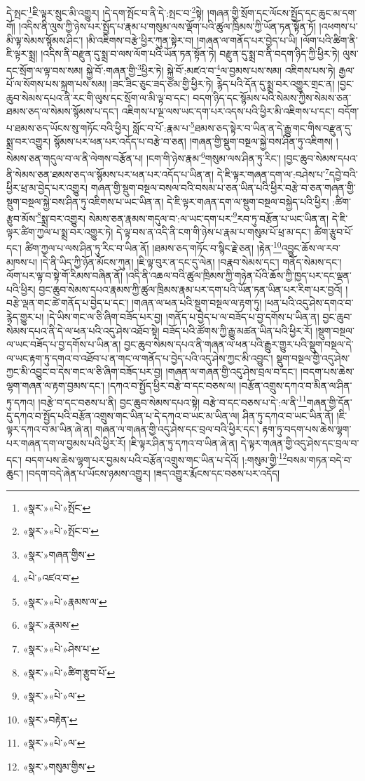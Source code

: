 དེ་སྤང་\footnote{«སྣར་»«པེ་»སྤོང་}ཇི་ལྟར་སྲུང་མི་འགྱུར། །དེ་དག་སྤོང་བ་ནི་དེ་:སྤང་བ་\footnote{«སྣར་»«པེ་»སྤོང་བ་}སྟེ། །གཞན་གྱི་སྲོག་དང་ལོངས་སྤྱོད་དང་ཆུང་མ་དག་གོ། །འདིས་ནི་ལུས་ཀྱི་ཉེས་པར་སྤྱོད་པ་རྣམ་པ་གསུམ་ལས་ལྡོག་པའི་ཚུལ་ཁྲིམས་ཀྱི་ཡོན་ཏན་སྟོན་ཏོ། །འཕགས་པ་མི་ལྟ་སེམས་སྙོམས་ཤིང་། །མི་འཇིགས་བརྩེ་ཕྱིར་ཀུན་སྟེར་བ། །གཞན་ལ་གནོད་པར་བྱེད་པ་ཡི། །ལོག་པའི་ཚིག་ནི་ཇི་ལྟར་སྨྲ། །འདིས་ནི་བརྫུན་དུ་སྨྲ་བ་ལས་ལོག་པའི་ཡོན་ཏན་སྟོན་ཏེ། བརྫུན་དུ་སྨྲ་བ་ནི་བདག་ཉིད་ཀྱི་ཕྱིར་ཏེ། ལུས་དང་སྲོག་ལ་ལྟ་བས་སམ། སྐྱེ་བོ་:གཞན་གྱི་\footnote{«སྣར་»གཞན་གྱིས་}ཕྱིར་ཏེ། སྐྱེ་བོ་:མཛའ་བ་\footnote{«པེ་»འཛའ་བ་}ལ་བྱམས་པས་སམ། འཇིགས་པས་ཏེ། རྒྱལ་པོ་ལ་སོགས་པས་སྐྲག་པས་སམ། །ཟང་ཟིང་ཅུང་ཟད་ཙམ་གྱི་ཕྱིར་ཏེ། རྙེད་པའི་དོན་དུ་སྨྲ་བར་འགྱུར་གྲང་ན། །བྱང་ཆུབ་སེམས་དཔའ་ནི་རང་གི་ལུས་དང་སྲོག་ལ་མི་ལྟ་བ་དང་། བདག་ཉིད་དང་སྙོམས་པའི་སེམས་ཀྱིས་སེམས་ཅན་ཐམས་ཅད་ལ་སེམས་སྙོམས་པ་དང་། འཇིགས་པ་ལྔ་ལས་ཡང་དག་པར་འདས་པའི་ཕྱིར་མི་འཇིགས་པ་དང་། བདོག་པ་ཐམས་ཅད་ཡོངས་སུ་གཏོང་བའི་ཕྱིར། སློང་བ་པོ་:རྣམ་པ་\footnote{«སྣར་»«པེ་»རྣམས་ལ་}ཐམས་ཅད་སྟེར་བ་ཡིན་ན་དེ་རྒྱུ་གང་གིས་བརྫུན་དུ་སྨྲ་བར་འགྱུར། སྙོམས་པར་ཕན་པར་འདོད་པ་བརྩེ་བ་ཅན། །གཞན་གྱི་སྡུག་བསྔལ་སྐྱེ་བས་ཤིན་ཏུ་འཇིགས། །སེམས་ཅན་གདུལ་བ་ལ་ནི་ལེགས་བརྩོན་པ། །ངག་གི་ཉེས་རྣམ་\footnote{«སྣར་»རྣམས་}གསུམ་ལས་ཤིན་ཏུ་རིང་། །བྱང་ཆུབ་སེམས་དཔའ་ནི་སེམས་ཅན་ཐམས་ཅད་ལ་སྙོམས་པར་ཕན་པར་འདོད་པ་ཡིན་ན། དེ་ཇི་ལྟར་གཞན་དག་ལ་:བཤེས་པ་\footnote{«སྣར་»«པེ་»ཤེས་པ་}དབྱེ་བའི་ཕྱིར་ཕྲ་མ་བྱེད་པར་འགྱུར། གཞན་གྱི་སྡུག་བསྔལ་བསལ་བའི་བསམ་པ་ཅན་ཡིན་པའི་ཕྱིར་བརྩེ་བ་ཅན་གཞན་གྱི་སྡུག་བསྔལ་སྐྱེ་བས་ཤིན་ཏུ་འཇིགས་པ་ཡང་ཡིན་ན། དེ་ཇི་ལྟར་གཞན་དག་ལ་སྡུག་བསྔལ་བསྐྱེད་པའི་ཕྱིར། :ཚིག་རྩུབ་མོས་\footnote{«སྣར་»«པེ་»ཚིག་རྩུབ་པོ་}སྨྲ་བར་འགྱུར། སེམས་ཅན་རྣམས་གདུལ་བ་:ལ་ཡང་དག་པར་\footnote{«སྣར་»«པེ་»ལ་}རབ་ཏུ་བརྩོན་པ་ཡང་ཡིན་ན། དེ་ཇི་ལྟར་ཚིག་ཀྱལ་པ་སྨྲ་བར་འགྱུར་ཏེ། དེ་ལྟ་བས་ན་འདི་ནི་ངག་གི་ཉེས་པ་རྣམ་པ་གསུམ་པོ་ཕྲ་མ་དང་། ཚིག་རྩུབ་པོ་དང་། ཚིག་ཀྱལ་པ་ལས་ཤིན་ཏུ་རིང་བ་ཡིན་ནོ། །ཐམས་ཅད་གཏོང་བ་སྙིང་རྗེ་ཅན། །རྟེན་\footnote{«སྣར་»བརྟེན་}འབྱུང་ཆོས་ལ་རབ་མཁས་པ། །དེ་ནི་ཡིད་ཀྱི་ཉོན་མོངས་ཀུན། །ཇི་ལྟ་བུར་ན་དང་དུ་ལེན། །བརྣབ་སེམས་དང་། གནོད་སེམས་དང་། ལོག་པར་ལྟ་བ་སྟེ་གོ་རིམས་བཞིན་ནོ། །འདི་ནི་འཆལ་བའི་ཚུལ་ཁྲིམས་ཀྱི་གཉེན་པོའི་ཆོས་ཀྱི་ཁྱད་པར་དང་ལྡན་པའི་ཕྱིར། བྱང་ཆུབ་སེམས་དཔའ་རྣམས་ཀྱི་ཚུལ་ཁྲིམས་རྣམ་པར་དག་པའི་ཡོན་ཏན་ཡིན་པར་རིག་པར་བྱའོ། །བརྩེ་ལྡན་གང་ཚེ་གནོད་པ་བྱེད་པ་དང་། །གཞན་ལ་ཕན་པའི་སྡུག་བསྔལ་ལ་རྟག་ཏུ། །ཕན་པའི་འདུ་ཤེས་དགའ་བ་རྙེད་གྱུར་པ། །དེ་ཡིས་གང་ལ་ཅི་ཞིག་བཟོད་པར་བྱ། །གནོད་པ་བྱེད་པ་ལ་བཟོད་པ་བྱ་དགོས་པ་ཡིན་ན། བྱང་ཆུབ་སེམས་དཔའ་ནི་དེ་ལ་ཕན་པའི་འདུ་ཤེས་འཐོབ་སྟེ། བཟོད་པའི་ཚོགས་ཀྱི་རྒྱུ་མཚན་ཡིན་པའི་ཕྱིར་རོ། །སྡུག་བསྔལ་ལ་ཡང་བཟོད་པ་བྱ་དགོས་པ་ཡིན་ན། བྱང་ཆུབ་སེམས་དཔའ་ནི་གཞན་ལ་ཕན་པའི་རྒྱུར་གྱུར་པའི་སྡུག་བསྔལ་དེ་ལ་ཡང་རྟག་ཏུ་དགའ་བ་འཐོབ་པ་ན་གང་ལ་གནོད་པ་བྱེད་པའི་འདུ་ཤེས་ཀྱང་མི་འབྱུང་། སྡུག་བསྔལ་གྱི་འདུ་ཤེས་ཀྱང་མི་འབྱུང་བ་དེས་གང་ལ་ཅི་ཞིག་བཟོད་པར་བྱ། །གཞན་ལ་གཞན་གྱི་འདུ་ཤེས་བྲལ་བ་དང་། །བདག་པས་ཆེས་ལྷག་གཞན་ལ་རྟག་བྱམས་དང་། །དཀའ་བ་སྤྱོད་ཕྱིར་བརྩེ་བ་དང་བཅས་ལ། །བརྩོན་འགྲུས་དཀའ་བ་མིན་ལ་ཤིན་ཏུ་དཀའ། །བརྩེ་བ་དང་བཅས་པ་ནི། བྱང་ཆུབ་སེམས་དཔའ་སྟེ། བརྩེ་བ་དང་བཅས་པ་དེ་:ལ་ནི་\footnote{«སྣར་»«པེ་»ལ་}གཞན་གྱི་དོན་དུ་དཀའ་བ་སྤྱོད་པའི་བརྩོན་འགྲུས་གང་ཡིན་པ་དེ་དཀའ་བ་ཡང་མ་ཡིན་ལ། ཤིན་ཏུ་དཀའ་བ་ཡང་ཡིན་ནོ། །ཇི་ལྟར་དཀའ་བ་མ་ཡིན་ཞེ་ན། གཞན་ལ་གཞན་གྱི་འདུ་ཤེས་དང་བྲལ་བའི་ཕྱིར་དང་། རྟག་ཏུ་བདག་པས་ཆེས་ལྷག་པར་གཞན་དག་ལ་བྱམས་པའི་ཕྱིར་རོ། །ཇི་ལྟར་ཤིན་ཏུ་དཀའ་བ་ཡིན་ཞེ་ན། དེ་ལྟར་གཞན་གྱི་འདུ་ཤེས་དང་བྲལ་བ་དང་། བདག་པས་ཆེས་ལྷག་པར་བྱམས་པའི་བརྩོན་འགྲུས་གང་ཡིན་པ་དེའོ། །:གསུམ་གྱི་\footnote{«སྣར་»གསུམ་གྱིས་}བསམ་གཏན་བདེ་བ་ཆུང་། །བདག་བདེ་ཞེན་པ་ཡོངས་ཉམས་འགྱུར། །ཟད་འགྱུར་རྨོངས་དང་བཅས་པར་འདོད། 